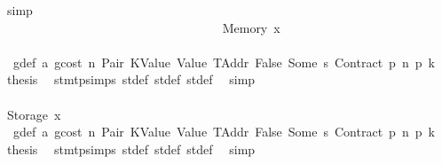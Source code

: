 \begin{isabellebody}
\ simp\isanewline
\ \ \ \ \ \ \ \ \ \ \ \ \ \ \ \ \ \ \ \ \ \ \ \ \ \ \ \ \ \ \ \ \isamarkupfalse%
\isanewline
\ \ \ \ \ \ \ \ \ \ \ \ \ \ \ \ \ \ \ \ \ \ \ \ \ \ \ \ \ \ \ \ \ \ \isamarkupfalse%
\ {\isacharparenleft}{\kern0pt}Memory\ x{}{\isacharparenright}{\kern0pt}\isanewline
\ \ \ \ \ \ \ \ \ \ \ \ \ \ \ \ \ \ \ \ \ \ \ \ \ \ \ \ \ \ \ \ \ \ \isamarkupfalse%
\ {}{\isacharparenleft}{\kern0pt}{}{\isacharparenright}{\kern0pt}\ g{\isacharunderscore}{\kern0pt}def\ a{}\ gcost\ n\ Pair\ KValue\ Value\ TAddr\ False\ Some\ s{}\ Contract\ p{}\ n{}\ p{}\ k{}\ \isamarkupfalse%
\ {\isacharquery}{\kern0pt}thesis\ \isamarkupfalse%
\ stmt{\isachardot}{\kern0pt}psimps{\isacharparenleft}{\kern0pt}{}{\isacharparenright}{\kern0pt}\ st{\isacharprime}{\kern0pt}{\isacharunderscore}{\kern0pt}def\ st{\isacharprime}{\kern0pt}{\isacharprime}{\kern0pt}{\isacharunderscore}{\kern0pt}def\ st{\isacharprime}{\kern0pt}{\isacharprime}{\kern0pt}{\isacharprime}{\kern0pt}{\isacharunderscore}{\kern0pt}def\ \isamarkupfalse%
\ simp\isanewline
\ \ \ \ \ \ \ \ \ \ \ \ \ \ \ \ \ \ \ \ \ \ \ \ \ \ \ \ \ \ \ \ \isamarkupfalse%
\isanewline
\ \ \ \ \ \ \ \ \ \ \ \ \ \ \ \ \ \ \ \ \ \ \ \ \ \ \ \ \ \ \ \ \ \ \isamarkupfalse%
\ {\isacharparenleft}{\kern0pt}Storage\ x{}{\isacharparenright}{\kern0pt}\isanewline
\ \ \ \ \ \ \ \ \ \ \ \ \ \ \ \ \ \ \ \ \ \ \ \ \ \ \ \ \ \ \ \ \ \ \isamarkupfalse%
\ {}{\isacharparenleft}{\kern0pt}{}{\isacharparenright}{\kern0pt}\ g{\isacharunderscore}{\kern0pt}def\ a{}\ gcost\ n\ Pair\ KValue\ Value\ TAddr\ False\ Some\ s{}\ Contract\ p{}\ n{}\ p{}\ k{}\ \isamarkupfalse%
\ {\isacharquery}{\kern0pt}thesis\ \isamarkupfalse%
\ stmt{\isachardot}{\kern0pt}psimps{\isacharparenleft}{\kern0pt}{}{\isacharparenright}{\kern0pt}\ st{\isacharprime}{\kern0pt}{\isacharunderscore}{\kern0pt}def\ st{\isacharprime}{\kern0pt}{\isacharprime}{\kern0pt}{\isacharunderscore}{\kern0pt}def\ st{\isacharprime}{\kern0pt}{\isacharprime}{\kern0pt}{\isacharprime}{\kern0pt}{\isacharunderscore}{\kern0pt}def\ \isamarkupfalse%
\ simp\isanewline
\ \ \ \ \ \ \ \ \ \ \ \ \ \ \ \ \ \ \ \ \ \ \ \ \ \ \ \ \ \ \ \ \isamarkupfalse%
\isanewline
\ \ \ \ \ \ \ \ \ \ \ \ \ \ \ \ \ \ \ \ \ \ \ \ \ \ \ \ \ \ \isamarkupfalse%

\end{isabellebody}
